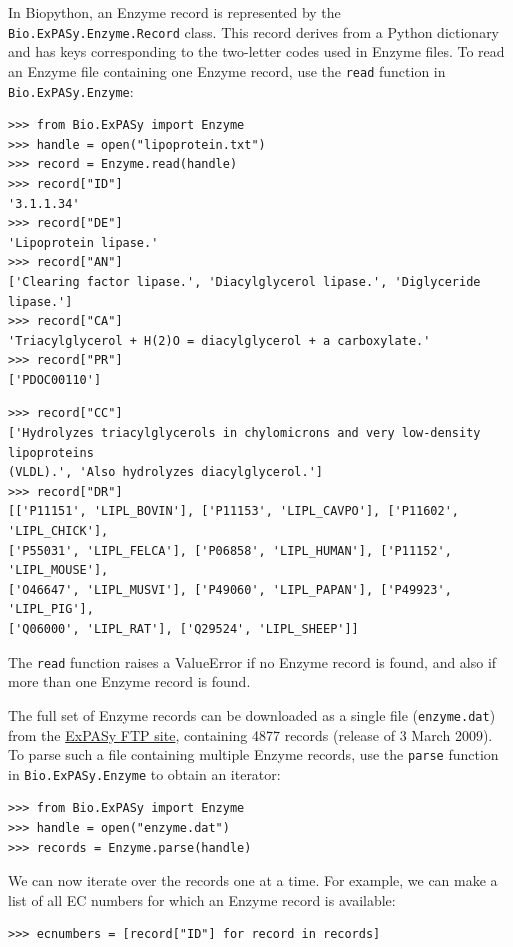 \documentclass{report}
\begin{document}
In Biopython, an Enzyme record is represented by the \verb|Bio.ExPASy.Enzyme.Record| class. This record derives from a Python dictionary and has keys corresponding to the two-letter codes used in Enzyme files. To read an Enzyme file containing one Enzyme record, use the \verb+read+ function in \verb|Bio.ExPASy.Enzyme|:

\begin{verbatim}
>>> from Bio.ExPASy import Enzyme
>>> handle = open("lipoprotein.txt")
>>> record = Enzyme.read(handle)
>>> record["ID"]
'3.1.1.34'
>>> record["DE"]
'Lipoprotein lipase.'
>>> record["AN"]
['Clearing factor lipase.', 'Diacylglycerol lipase.', 'Diglyceride lipase.']
>>> record["CA"]
'Triacylglycerol + H(2)O = diacylglycerol + a carboxylate.'
>>> record["PR"]
['PDOC00110']
\end{verbatim}
\begin{verbatim}
>>> record["CC"]
['Hydrolyzes triacylglycerols in chylomicrons and very low-density lipoproteins
(VLDL).', 'Also hydrolyzes diacylglycerol.']
>>> record["DR"]
[['P11151', 'LIPL_BOVIN'], ['P11153', 'LIPL_CAVPO'], ['P11602', 'LIPL_CHICK'],
['P55031', 'LIPL_FELCA'], ['P06858', 'LIPL_HUMAN'], ['P11152', 'LIPL_MOUSE'],
['O46647', 'LIPL_MUSVI'], ['P49060', 'LIPL_PAPAN'], ['P49923', 'LIPL_PIG'],
['Q06000', 'LIPL_RAT'], ['Q29524', 'LIPL_SHEEP']]
\end{verbatim}
The \verb+read+ function raises a ValueError if no Enzyme record is found, and also if more than one Enzyme record is found.

The full set of Enzyme records can be downloaded as a single file (\verb|enzyme.dat|) from the \href{ftp://ftp.expasy.org/databases/enzyme/enzyme.dat}{ExPASy FTP site}, containing 4877 records (release of 3 March 2009). To parse such a file containing multiple Enzyme records, use the \verb+parse+ function in \verb+Bio.ExPASy.Enzyme+ to obtain an iterator:

\begin{verbatim}
>>> from Bio.ExPASy import Enzyme
>>> handle = open("enzyme.dat")
>>> records = Enzyme.parse(handle)
\end{verbatim}

We can now iterate over the records one at a time. For example, we can make a list of all EC numbers for which an Enzyme record is available:
\begin{verbatim}
>>> ecnumbers = [record["ID"] for record in records]
\end{verbatim}
\end{document}
